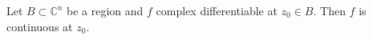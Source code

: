 Let $B \subset \mathbb{C}^n$ be a region and $f$ complex differentiable at $z_0 \in B$. Then $f$ is continuous at $z_0$.
